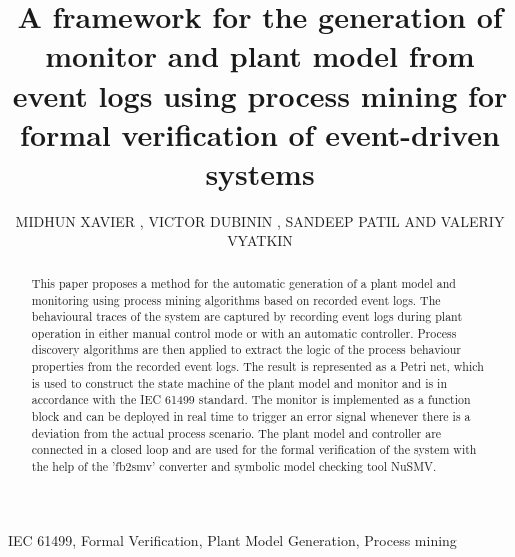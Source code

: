 \documentclass{ieeeojies}
\begin{document}
\title{A framework for the generation of monitor and  plant model from event logs using process mining for formal verification of event-driven systems}

\author{\uppercase{Midhun Xavier} ,
\uppercase{Victor Dubinin} ,
\uppercase{Sandeep Patil} \uppercase{ and Valeriy Vyatkin}  
}
\address[1]{Luleå University of Technology, Luleå, Sweden (e-mails: midhun.xavier@ltu.se, sandeep.patil@ltu.se)}
\address[2]{Independent researcher (e-mail: dubinin.victor@gmail.com)}
\address[3]{Aalto University, Helsinki, Finland}





\linenumbers

\begin{abstract}

This paper proposes a method for the automatic generation of a plant model and monitoring using process mining algorithms based on recorded event logs. The behavioural traces of the system are captured by recording event logs during plant operation in either manual control mode or with an automatic controller. Process discovery algorithms are then applied to extract the logic of the process behaviour properties from the recorded event logs. The result is represented as a Petri net, which is used to construct the state machine of the plant model and monitor and is in accordance with the IEC 61499 standard.  The monitor is implemented as a function block and can be deployed in  real time   to trigger an error signal whenever there is a deviation from the actual process scenario. The plant model and controller are connected in a closed loop and are used for the formal verification of the system with the help of the 'fb2smv' converter and symbolic model checking tool NuSMV.


\end{abstract}

\begin{keywords} IEC 61499, Formal Verification, Plant Model Generation, Process mining
\end{keywords}

\titlepgskip=-15pt
\end{document}
